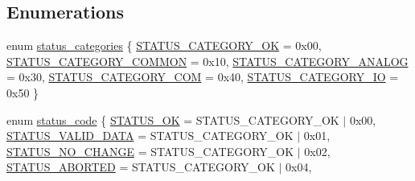 \subsection*{Enumerations}
\begin{DoxyCompactItemize}
\item 
enum \mbox{\hyperlink{group__group__sam0__utils__status__codes_ga477539e8a67b0cab096e8ecda6f5d7d6}{status\+\_\+categories}} \{ \newline
\mbox{\hyperlink{group__group__sam0__utils__status__codes_gga477539e8a67b0cab096e8ecda6f5d7d6aaa175766b32254ce724cb2115cb833cb}{S\+T\+A\+T\+U\+S\+\_\+\+C\+A\+T\+E\+G\+O\+R\+Y\+\_\+\+OK}} = 0x00, 
\mbox{\hyperlink{group__group__sam0__utils__status__codes_gga477539e8a67b0cab096e8ecda6f5d7d6adbdddc5a6c26ebfc5709c6680508e586}{S\+T\+A\+T\+U\+S\+\_\+\+C\+A\+T\+E\+G\+O\+R\+Y\+\_\+\+C\+O\+M\+M\+ON}} = 0x10, 
\mbox{\hyperlink{group__group__sam0__utils__status__codes_gga477539e8a67b0cab096e8ecda6f5d7d6ae280b1429e0c0c3e7c5034a8e6525d09}{S\+T\+A\+T\+U\+S\+\_\+\+C\+A\+T\+E\+G\+O\+R\+Y\+\_\+\+A\+N\+A\+L\+OG}} = 0x30, 
\mbox{\hyperlink{group__group__sam0__utils__status__codes_gga477539e8a67b0cab096e8ecda6f5d7d6a5da61c6ec4df654b434834c144871c18}{S\+T\+A\+T\+U\+S\+\_\+\+C\+A\+T\+E\+G\+O\+R\+Y\+\_\+\+C\+OM}} = 0x40, 
\newline
\mbox{\hyperlink{group__group__sam0__utils__status__codes_gga477539e8a67b0cab096e8ecda6f5d7d6a7bce8dd98808235ee2e006683b6626c1}{S\+T\+A\+T\+U\+S\+\_\+\+C\+A\+T\+E\+G\+O\+R\+Y\+\_\+\+IO}} = 0x50
 \}
\item 
enum \mbox{\hyperlink{group__group__sam0__utils__status__codes_ga751c892e5a46b8e7d282085a5a5bf151}{status\+\_\+code}} \{ \newline
\mbox{\hyperlink{group__group__sam0__utils__status__codes_gga751c892e5a46b8e7d282085a5a5bf151a7e4a42e3b6dd63708c64cf3db6f69566}{S\+T\+A\+T\+U\+S\+\_\+\+OK}} = S\+T\+A\+T\+U\+S\+\_\+\+C\+A\+T\+E\+G\+O\+R\+Y\+\_\+\+OK $\vert$ 0x00, 
\mbox{\hyperlink{group__group__sam0__utils__status__codes_gga751c892e5a46b8e7d282085a5a5bf151a173059dc976011177230bb90a454817e}{S\+T\+A\+T\+U\+S\+\_\+\+V\+A\+L\+I\+D\+\_\+\+D\+A\+TA}} = S\+T\+A\+T\+U\+S\+\_\+\+C\+A\+T\+E\+G\+O\+R\+Y\+\_\+\+OK $\vert$ 0x01, 
\mbox{\hyperlink{group__group__sam0__utils__status__codes_gga751c892e5a46b8e7d282085a5a5bf151a0d5c274714504a0ee3eb63aac07737d4}{S\+T\+A\+T\+U\+S\+\_\+\+N\+O\+\_\+\+C\+H\+A\+N\+GE}} = S\+T\+A\+T\+U\+S\+\_\+\+C\+A\+T\+E\+G\+O\+R\+Y\+\_\+\+OK $\vert$ 0x02, 
\mbox{\hyperlink{group__group__sam0__utils__status__codes_gga751c892e5a46b8e7d282085a5a5bf151ab452e48ecfd93c178a080080d4ab2d3c}{S\+T\+A\+T\+U\+S\+\_\+\+A\+B\+O\+R\+T\+ED}} = S\+T\+A\+T\+U\+S\+\_\+\+C\+A\+T\+E\+G\+O\+R\+Y\+\_\+\+OK $\vert$ 0x04, 

\end{DoxyCompactItemize}
